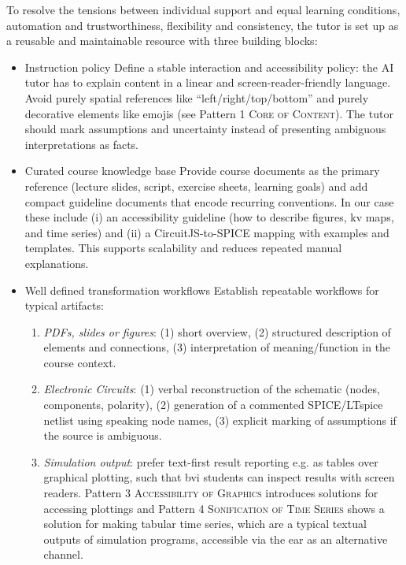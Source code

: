 To resolve the tensions between individual support and equal learning conditions, automation and trustworthiness, flexibility and consistency, the tutor is set up as a reusable and maintainable resource with three building blocks:

\begin{itemize}
    \item Instruction policy
    \newline
    Define a stable interaction and accessibility policy: the AI tutor has to explain content in a linear and screen-reader-friendly language. Avoid purely spatial references like ``left/right/top/bottom'' and purely decorative elements like emojis (see Pattern 1 \textsc{Core of Content}). The tutor should mark assumptions and uncertainty instead of presenting ambiguous interpretations as facts.
    

    \item Curated course knowledge base
    \newline
    Provide course documents as the primary reference (lecture slides, script, exercise sheets, learning goals) and add compact guideline documents that encode recurring conventions. In our case these include (i) an accessibility guideline (how to describe figures, \ac{kv} maps, and time series) and (ii) a CircuitJS-to-SPICE mapping with examples and templates. This supports scalability and reduces repeated manual explanations.

    \item Well defined transformation workflows
    \newline
    Establish repeatable workflows for typical artifacts:
    \begin{enumerate}
        \item \emph{PDFs, slides or figures}: (1) short overview, (2) structured description of elements and connections, (3) interpretation of meaning/function in the course context.
        \item \emph{Electronic Circuits}: (1) verbal reconstruction of the schematic (nodes, components, polarity), (2) generation of a commented SPICE/LTspice netlist using speaking node names, (3) explicit marking of assumptions if the source is ambiguous.
        \item \emph{Simulation output}: prefer text-first result reporting e.g. as  tables  over graphical plotting, such that \ac{bvi} students can inspect results with screen readers.  Pattern 3 \textsc{Accessibility of Graphics} introduces solutions for accessing plottings and Pattern 4 \textsc{Sonification of Time Series} 
shows a solution for making tabular time series, which are a typical textual outputs of simulation programs, accessible via the ear as an alternative channel.  
    \end{enumerate}
\end{itemize}

